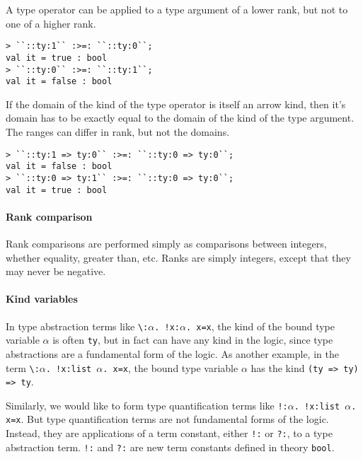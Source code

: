 A type operator can be applied to a type argument of a lower rank,
but not to one of a higher rank.

%
\begin{session}
\begin{verbatim}
> ``::ty:1`` :>=: ``::ty:0``;
val it = true : bool
> ``::ty:0`` :>=: ``::ty:1``;
val it = false : bool
\end{verbatim}
\end{session}

If the domain of the kind of the type operator is itself an arrow kind, then
it's domain has to be exactly equal to the domain of the kind of
the type argument.  The ranges can differ in rank, but not the domains.
%
\begin{session}
\begin{verbatim}
> ``::ty:1 => ty:0`` :>=: ``::ty:0 => ty:0``;
val it = false : bool
> ``::ty:0 => ty:1`` :>=: ``::ty:0 => ty:0``;
val it = true : bool
\end{verbatim}
\end{session}

\paragraph{Rank comparison}

Rank comparisons are performed simply as \ML{} comparisons between integers,
whether equality, greater than, etc.  Ranks are simply integers, except that
they may never be negative.

\paragraph{Kind variables}

In type abstraction terms like
{\small\verb|\:|}$\alpha${\small\verb|. !x:|}$\alpha${\small\verb|. x=x|},
the kind of the bound type variable $\alpha$ is often \texttt{ty}, but in fact
can have any kind
in the \HOLW{} logic,
since type abstractions are a fundamental form of the logic.
As another example, in the term
{\small\verb|\:|}$\alpha${\small\verb|. !x:list|}~$\alpha${\small\verb|. x=x|},
the bound type variable $\alpha$ has the kind \texttt{(ty => ty) => ty}.

Similarly, we would like to form type quantification terms like
{\small\verb|!:|}$\alpha${\small\verb|. !x:list|}~$\alpha${\small\verb|. x=x|}.
But type quantification terms are not fundamental forms of the \HOLW{} logic.
Instead, they are applications of a term constant, either {\small\verb|!:|}
or {\small\verb|?:|}, to a type abstraction term.
{\small\verb|!:|} and {\small\verb|?:|} are new term constants
defined in theory \texttt{bool}.

